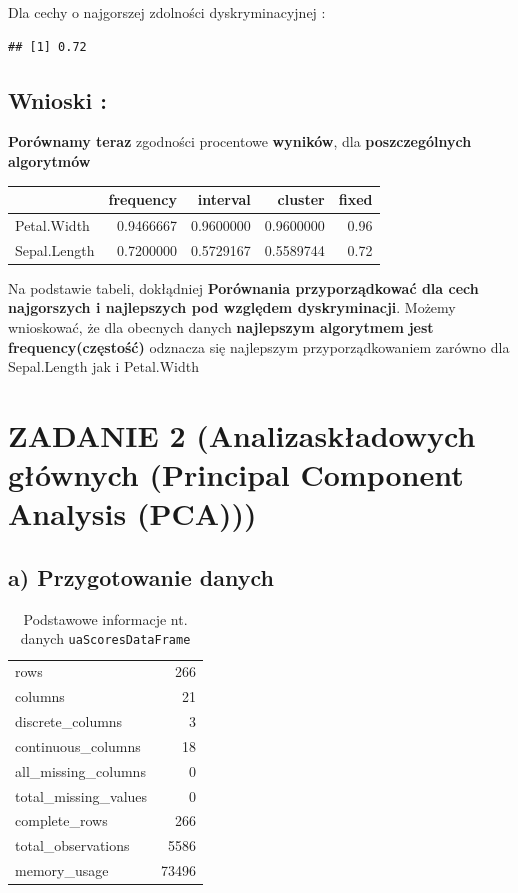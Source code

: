 \documentclass[
  12pt,
]{article}
\begin{document}
Dla cechy o najgorszej zdolności dyskryminacyjnej :

\begin{verbatim}
## [1] 0.72
\end{verbatim}

\subsection{Wnioski :}\label{wnioski}

\textbf{Porównamy teraz} zgodności procentowe \textbf{wyników}, dla
\textbf{poszczególnych algorytmów}

\begin{longtable}[]{@{}lrrrr@{}}
\toprule\noalign{}
& frequency & interval & cluster & fixed \\
\midrule\noalign{}
\endhead
\bottomrule\noalign{}
\endlastfoot
Petal.Width & 0.9466667 & 0.9600000 & 0.9600000 & 0.96 \\
Sepal.Length & 0.7200000 & 0.5729167 & 0.5589744 & 0.72 \\
\end{longtable}

Na podstawie tabeli, dokłądniej \textbf{Porównania przyporządkować dla
cech najgorszych i najlepszych pod względem dyskryminacji}. Możemy
wnioskować, że dla obecnych danych \textbf{najlepszym algorytmem}
\textbf{jest frequency(częstość)} odznacza się najlepszym
przyporządkowaniem zarówno dla Sepal.Length jak i Petal.Width

\section{ZADANIE 2 (Analizaskładowych głównych (Principal Component
Analysis
(PCA)))}\label{zadanie-2-analizaskux142adowych-gux142uxf3wnych-principal-component-analysis-pca}

\subsection{a) Przygotowanie danych}\label{a-przygotowanie-danych}

\begin{longtable}[]{@{}lr@{}}
\caption{Podstawowe informacje nt. danych
\texttt{uaScoresDataFrame}}\tabularnewline
\toprule\noalign{}
\endfirsthead
\endhead
\bottomrule\noalign{}
\endlastfoot
rows & 266 \\
columns & 21 \\
discrete\_columns & 3 \\
continuous\_columns & 18 \\
all\_missing\_columns & 0 \\
total\_missing\_values & 0 \\
complete\_rows & 266 \\
total\_observations & 5586 \\
memory\_usage & 73496 \\
\end{longtable}
\end{document}
